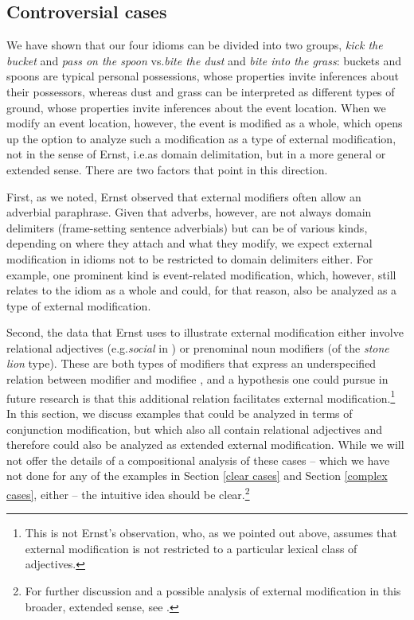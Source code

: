 \documentclass[output=paper]{langsci/langscibook}
\begin{document}
\subsection{Controversial cases} \label{controversial cases}

We have shown that our four idioms can be divided into two groups, \textit{kick the bucket} and \textit{pass on the spoon} vs.\@ \textit{bite the dust} and \textit{bite into the grass}: buckets and spoons are typical personal possessions, whose properties invite inferences about their possessors, whereas dust and grass can be interpreted as different types of ground, whose properties invite inferences about the event location. When we modify an event location, however, the event is modified as a whole, which opens up the option to analyze such a modification as a type of external modification, not in the sense of Ernst, i.e.\@ as domain delimitation, but in a more general or extended sense. There are two factors that point in this direction. 

First, as we noted, Ernst observed that external modifiers often allow an adverbial paraphrase. Given that adverbs, however, are not always domain delimiters (frame-setting sentence adverbials) but can be of various kinds, depending on where they attach and what they modify, we expect external modification in idioms not to be restricted to domain delimiters either. For example, one prominent kind is event-related modification, which, however, still relates to the idiom as a whole and could, for that reason, also be analyzed as a type of external modification.

Second, the data that Ernst uses to illustrate external modification either involve relational adjectives (e.g.\@ \textit{social} in ) or prenominal noun modifiers (of the \textit{stone lion} type). These are both types of modifiers that express an underspecified relation between modifier and modifiee \citep[see, e.g.\@,][]{mcnallyboleda04}, and a hypothesis one could pursue in future research is that this additional relation facilitates external modification.\footnote{This is not Ernst's observation, who, as we pointed out above, assumes that external modification is not restricted to a particular lexical class of adjectives.} In this section, we discuss examples that could be analyzed in terms of conjunction modification, but which also all contain relational adjectives and therefore could also be analyzed as extended external modification. While we will not offer the details of a compositional analysis of these cases -- which we have not done for any of the examples in Section \ref{clear cases} and Section \ref{complex cases}, either -- the intuitive idea should be clear.\footnote{For further discussion and a possible analysis of external modification in this broader, extended sense, see \cite{gehrkemcnally18}.}
\end{document}
